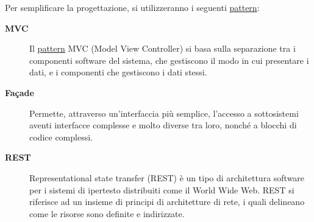 \documentclass[11pt,a4paper]{article}
\begin{document}
Per semplificare la progettazione, si utilizzeranno i seguenti \underline{pattern}:
\begin{description}
 \item[\textbf{MVC}] 
Il \underline{pattern} MVC (Model View Controller) si basa sulla separazione tra i componenti software del sistema, che gestiscono il modo in cui presentare i dati, e i componenti che gestiscono i dati stessi. 
 \item[\textbf{Façade}]
Permette, attraverso un'interfaccia più semplice, l'accesso a sottosistemi aventi interfacce complesse e molto diverse tra loro, nonché a blocchi di codice complessi.
\item[\textbf{REST}]
Representational state transfer (REST) è un tipo di architettura software per i sistemi di ipertesto distribuiti come il World Wide Web. 
REST si riferisce ad un insieme di principi di architetture di rete, i quali delineano come le risorse sono definite e indirizzate.



\end{description}
\end{document}
